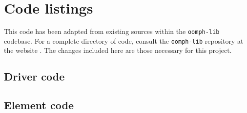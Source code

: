 \documentclass[12pt,MSc,twoside]{muthesis}
\def \oomph {\texttt{oomph-lib} }
\begin{document}
\ifdefined\nopreamble
\else
	 
\fi











\ifdefined\nopreamble
\else
  \appendix
  \chapter{Code listings}

  This code has been adapted from existing sources within the \oomph codebase.
  For a complete directory of code, consult the \oomph repository at the website \cite{oomph}.
  The changes included here are those necessary for this project.

  \section{Driver code}
  

  \clearpage
  \section{Element code}
  
\fi
\end{document}
